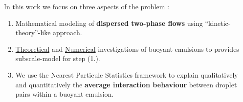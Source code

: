 \documentclass{sintefbeamer}
\begin{document}
\begin{frame}
  {In this work we focus on three aspects of the problem :}
  \Large
  \begin{enumerate}
    \item<1-3> Mathematical modeling of \textbf{dispersed two-phase flows} using ``kinetic-theory''-like approach. 
      \item<4-6,8> \underline{Theoretical} and \underline{Numerical} investigations of buoyant emulsions to provides subscale-model for step (\textcolor{sintefblue}{1.}). 
    \item<7>{We use the Nearest Particule Statistics framework to explain qualitatively and quantitatively the \textbf{average interaction behaviour} between droplet pairs within a buoyant emulsion. }
  \end{enumerate}
\end{frame}
\end{document}
